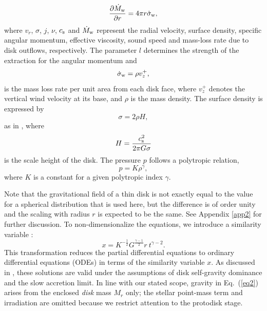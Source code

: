 \documentclass[twocolumn,linenumbers]{aastex631}
\begin{document}
\begin{equation}
\frac{\partial \dot{M}_{\rm w}}{\partial r}=4 \pi r \dot{\sigma}_{\rm w},
\label{eq4}
\end{equation}
where $v_{r}$, $\sigma$, $j$, ${\nu}$, \textbf{$c_{\rm s}$} and $\dot{M}_{\rm w}$ represent the radial velocity, surface density, specific angular momentum, effective viscosity, sound speed and mass-loss rate due to disk outflows, respectively.
The parameter ${l}$ determines the strength of the extraction for the angular momentum and 
\begin{equation}
\dot{\sigma}_{\rm w}=\rho v_{z}^{+},
\label{eq5}
\end{equation}
is the mass loss rate per unit area from each disk face, where $v_{z}^{+}$ denotes the vertical wind velocity at its base, and $\rho$ is the mass density. The surface density is expressed by 
\begin{equation}
\sigma = 2\rho H,
\label{surface density}
\end{equation}
as in \cite{abbassi2013viscous}, where
\begin{equation}
H=\frac{c_{\rm s}^2}{2\pi G \sigma}
\label{eq6}
\end{equation}
is the scale height of the disk.
The pressure $p$ follows a polytropic relation,
\begin{equation}
p=K\rho^{\gamma},
\label{eq7}
\end{equation}
where $K$ is a constant for a given polytropic index $\gamma$.

Note that the gravitational field of a thin disk is not exactly equal to the value for a spherical distribution that is used here, but the difference is of order unity and the scaling with radius $r$ is expected to be the same. See Appendix \ref{app2} for further discussion.
To non-dimensionalize the equations, we introduce a similarity variable \citep{yahil1983self, mineshige1997self}:
\begin{equation}
x = K^{-\frac{1}{2}}G^{\frac{\gamma-1}{2}} r ~ t^{\gamma-2}.
\label{eq8}
\end{equation}
This transformation reduces the partial differential equations to ordinary differential equations (ODEs) in terms of the similarity variable $x$. As discussed in \citet{abbassi2013viscous}, these solutions are valid under the assumptions of disk self-gravity dominance and the slow accretion limit. In line with our stated scope, gravity in Eq.~(\ref{eq2}) arises from the enclosed \emph{disk} mass $M_r$ only; the stellar point-mass term and irradiation are omitted because we restrict attention to the protodisk stage.
\end{document}

